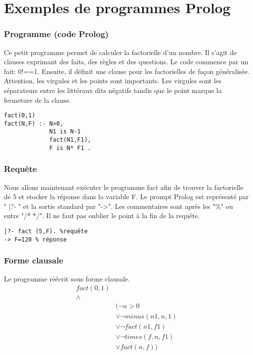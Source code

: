 
\author{Baptiste Degryse (27641200)}
\author{Charles Jacquet (27811200)}
\author{Jérôme Lemaire (6960100)}

\section{Exemples de programmes Prolog}

\subsubsection{Programme (code Prolog)}
Ce petit programme permet de calculer la factorielle d'un nombre. Il s'agit de clauses exprimant des faits, des règles et des questions. Le code commence par un fait: 0!==1. Ensuite, il définit une clause pour les factorielles de façon généralisée. Attention, les virgules et les points sont importants. Les virgules sont les séparateurs entre les littéraux dits négatifs tandis que le point marque la fermeture de la clause.
\begin{verbatim}
fact(0,1)
fact(N,F) :- N>0, 
			 N1 is N-1 
			 fact(N1,F1), 
			 F is N* F1 .
\end{verbatim}
\subsubsection{Requête} Nous allons maintenant exécuter le programme fact afin de trouver la factorielle de 5 et stocker la réponse dans la variable F. Le prompt Prolog est représenté par " |?- " et la sortie standard par "->". Les commentaires sont après les "\%" ou entre "/* */". Il ne faut pas oublier le point à la fin de la requête.
\begin{verbatim} 
|?- fact (5,F). %requête
-> F=120 % réponse
\end{verbatim}

\subsubsection{Forme clausale}
Le programme réécrit sous forme clausale. 
\begin{align*}
fact(0,1) \\
 \wedge & \\
&( \neg n > 0 \\
&	\vee \neg minus( n1, n, 1) \\
&	\vee \neg fact(n1, f1) \\
&	\vee \neg times(f, n, f1) \\
&	\vee fact(n, f) ) \\
\end{align*}



